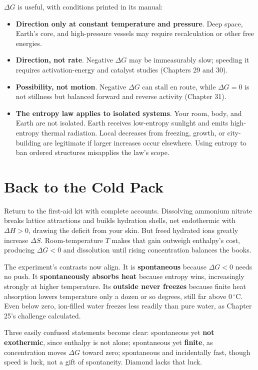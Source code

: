 $\Delta G$ is useful, with conditions printed in its manual:

\begin{itemize}[itemsep=2pt]
\item \textbf{Direction only at constant temperature and pressure}. Deep space, Earth's core, and high-pressure vessels may require recalculation or other free energies.
\item \textbf{Direction, not rate}. Negative $\Delta G$ may be immeasurably slow; speeding it requires activation-energy and catalyst studies (Chapters 29 and 30).
\item \textbf{Possibility, not motion}. Negative $\Delta G$ can stall en route, while $\Delta G=0$ is not stillness but balanced forward and reverse activity (Chapter 31).
\item \textbf{The entropy law applies to isolated systems}. Your room, body, and Earth are not isolated. Earth receives low-entropy sunlight and emits high-entropy thermal radiation. Local decreases from freezing, growth, or city-building are legitimate if larger increases occur elsewhere. Using entropy to ban ordered structures misapplies the law's scope.
\end{itemize}

\section{Back to the Cold Pack}

Return to the first-aid kit with complete accounts. Dissolving ammonium nitrate breaks lattice attractions and builds hydration shells, net endothermic with $\Delta H>0$, drawing the deficit from your skin. But freed hydrated ions greatly increase $\Delta S$. Room-temperature $T$ makes that gain outweigh enthalpy's cost, producing $\Delta G<0$ and dissolution until rising concentration balances the books.

The experiment's contrasts now align. It is \textbf{spontaneous} because $\Delta G<0$ needs no push. It \textbf{spontaneously absorbs heat} because entropy wins, increasingly strongly at higher temperature. Its \textbf{outside never freezes} because finite heat absorption lowers temperature only a dozen or so degrees, still far above $0\,^{\circ}\mathrm{C}$. Even below zero, ion-filled water freezes less readily than pure water, as Chapter 25's challenge calculated.

Three easily confused statements become clear: spontaneous yet \textbf{not exothermic}, since enthalpy is not alone; spontaneous yet \textbf{finite}, as concentration moves $\Delta G$ toward zero; spontaneous and incidentally fast, though speed is luck, not a gift of spontaneity. Diamond lacks that luck.

